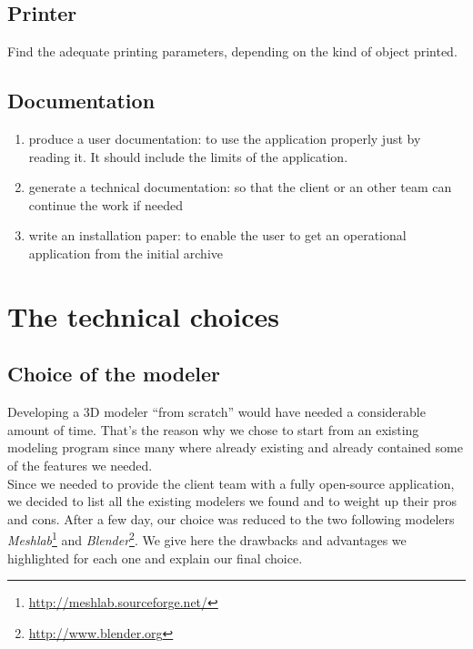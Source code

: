 \documentclass{report}
\begin{document}
\subsection{Printer}

Find the adequate printing parameters, depending on the kind of object printed.

\subsection{Documentation}

\begin{enumerate}
\item produce a user documentation: to use the application properly just by reading it. It should include the limits of the application.
\item generate a technical documentation: so that the client or an other team can continue the work if needed
\item write an installation paper: to enable the user to get an operational application from the initial archive
\end{enumerate}



\section{The technical choices}

\subsection{Choice of the modeler}

Developing a 3D modeler ``from scratch'' would have needed a considerable amount of time. That's the reason why we chose to start from an existing modeling program since many where already existing and already contained some of the features we needed.\\

Since we needed to provide the client team with a fully open-source application, we decided to list all the existing modelers we found and to weight up their pros and cons. After a few day, our choice was reduced to the two following modelers \emph{Meshlab}\footnote{\url{http://meshlab.sourceforge.net/}} and \emph{Blender}\footnote{\url{http://www.blender.org}}. We give here the drawbacks and advantages we highlighted for each one and explain our final choice.

\bigskip
\end{document}
